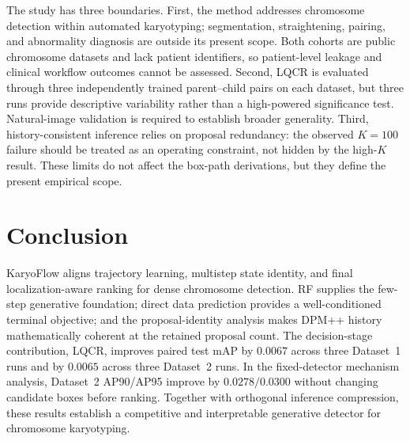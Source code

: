 \documentclass[journal,10pt]{IEEEtran}
\theoremstyle{definition}
\begin{document}
The study has three boundaries. First, the method addresses chromosome
detection within automated karyotyping; segmentation, straightening, pairing,
and abnormality diagnosis are outside its present scope. Both cohorts are public chromosome
datasets and lack patient identifiers, so patient-level leakage and clinical
workflow outcomes cannot be assessed. Second, LQCR is evaluated through three
independently trained parent--child pairs on each dataset, but three runs
provide descriptive variability rather than a high-powered significance test.
Natural-image validation is required to establish broader generality.
Third, history-consistent inference relies on proposal redundancy: the observed
$K=100$ failure should be treated as an operating constraint, not hidden by the
high-$K$ result. These limits do not affect the box-path derivations, but they
define the present empirical scope.

\section{Conclusion}\label{sec:conclusion}
KaryoFlow aligns trajectory learning, multistep state identity, and final
localization-aware ranking for dense chromosome detection. RF supplies the
few-step generative foundation; direct data prediction provides a
well-conditioned terminal objective; and the proposal-identity analysis makes DPM++
history mathematically coherent at the retained proposal count. The
decision-stage contribution, LQCR, improves paired test mAP by $0.0067$ across
three Dataset~1 runs and by $0.0065$ across three Dataset~2 runs. In the
fixed-detector mechanism analysis, Dataset~2 AP90/AP95 improve by
$0.0278/0.0300$ without changing candidate boxes before ranking.
Together with orthogonal inference compression, these results establish a
competitive and interpretable generative detector for chromosome karyotyping.



\end{document}
